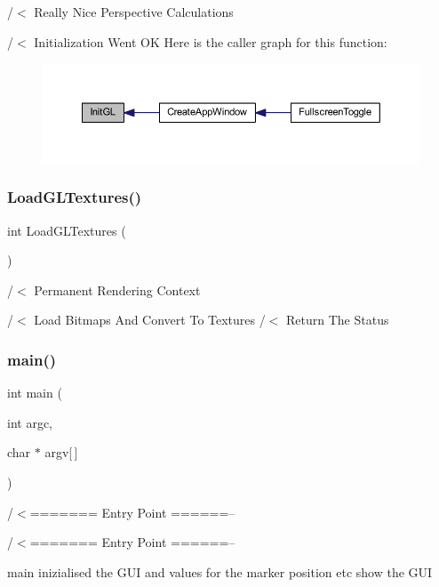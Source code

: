 /$<$ Really Nice Perspective Calculations

/$<$ Initialization Went OK Here is the caller graph for this function\+:\nopagebreak
\begin{figure}[H]
\begin{center}
\leavevmode
\includegraphics[width=350pt]{supportcode_8cpp_aa4c387d3f1ebce6d57684b6a10c9b0ae_icgraph}
\end{center}
\end{figure}
\mbox{\label{supportcode_8cpp_a8dd15539ba90ae3670aa0a9f889d2236}} 
\subsubsection{Load\+G\+L\+Textures()}
{\footnotesize\ttfamily int Load\+G\+L\+Textures (\begin{DoxyParamCaption}{ }\end{DoxyParamCaption})}



/$<$ Permanent Rendering Context 

/$<$ Load Bitmaps And Convert To Textures /$<$ Return The Status \mbox{\label{supportcode_8cpp_a0ddf1224851353fc92bfbff6f499fa97}} 
\subsubsection{main()}
{\footnotesize\ttfamily int main (\begin{DoxyParamCaption}\item[{int}]{argc,  }\item[{char $\ast$}]{argv[$\,$] }\end{DoxyParamCaption})}



/$<$======= Entry Point ======-- 

/$<$======= Entry Point ======--

main inizialised the G\+UI and values for the marker position etc show the G\+UI

